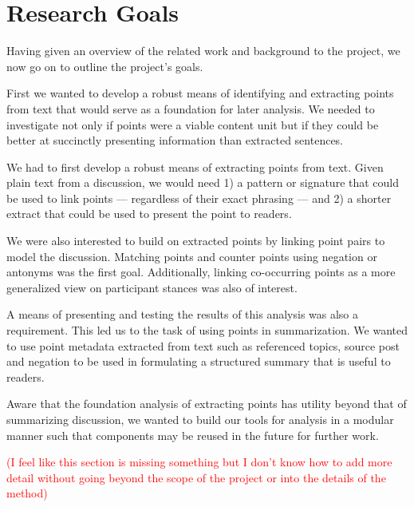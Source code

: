 \chapter{Research Goals\label{chap:res-goals}}
  Having given an overview of the related work and background to the project, we now go on to outline the project's goals.

  First we wanted to develop a robust means of identifying and extracting points from text that would serve as a foundation for later analysis. We needed to investigate not only if points were a viable content unit but if they could be better at succinctly presenting information than extracted sentences.

  We had to first develop a robust means of extracting points from text. Given plain text from a discussion, we would need 1) a pattern or signature that could be used to link points --- regardless of their exact phrasing --- and 2) a shorter extract that could be used to present the point to readers.

  We were also interested to build on extracted points by linking point pairs to model the discussion. Matching points and counter points using negation or antonyms was the first goal. Additionally, linking co-occurring points as a more generalized view on participant stances was also of interest.

  A means of presenting and testing the results of this analysis was also a requirement. This led us to the task of using points in summarization. We wanted to use point metadata extracted from text such as referenced topics, source post and negation to be used in formulating a structured summary that is useful to readers.

  Aware that the foundation analysis of extracting points has utility beyond that of summarizing discussion, we wanted to build our tools for analysis in a modular manner such that components may be reused in the future for further work.

  \textcolor{red}{(I feel like this section is missing something but I don't know how to add more detail without going beyond the scope of the project or into the details of the method)}
